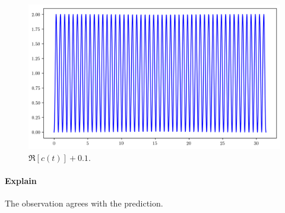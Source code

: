 \documentclass[12pt,a4paper,twoside]{article}
\begin{document}
\begin{enumerate}[(1)]
\begin{figure}[!h]
	\centering
	\includegraphics[width=\textwidth]{plusplusreal.png}
	\caption{$\Re[c(t)] + 0.1$.}
	\label{fig:plusimag}
\end{figure}

\paragraph{Explain} The observation agrees with the prediction.

\end{enumerate}

%
%


%
\end{document}
